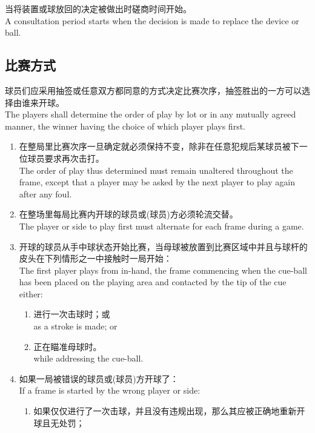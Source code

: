 \begin{enumerate}[label=(\alph*)]
\begin{enumerate}[label=(\roman*)]
        当将装置或球放回的决定被做出时磋商时间开始。\\
        A consultation period starts when the decision is made to replace the device or ball.
    \end{enumerate}
\end{enumerate}

\subsection{比赛方式}\label{2233}

\noindent 球员们应采用抽签或任意双方都同意的方式决定比赛次序，抽签胜出的一方可以选择由谁来开球。\\
The players shall determine the order of play by lot or in any mutually agreed manner, the winner having the choice of which player plays first.
\begin{enumerate}[label=(\alph*)]
    \item 在整局里比赛次序一旦确定就必须保持不变，除非在任意犯规后某球员被下一位球员要求再次击打。\\
    The order of play thus determined must remain unaltered throughout the frame, except that a player may be asked by the next player to play again after any foul.
    \item 在整场里每局比赛内开球的球员或(球员)方必须轮流交替。\\
    The player or side to play first must alternate for each frame during a game.
    \item \label{2233c}开球的球员从手中球状态开始比赛，当母球被放置到比赛区域中并且与球杆的皮头在下列情形之一中接触时一局开始：\\
    The first player plays from in-hand, the frame commencing when the cue-ball has been placed on the playing area and contacted by the tip of the cue either:
    \begin{enumerate}[label=(\roman*)]
        \item 进行一次击球时；或\\
        as a stroke is made; or
        \item 正在瞄准母球时。\\
        while addressing the cue-ball.
    \end{enumerate}
    \item \label{2233d}如果一局被错误的球员或(球员)方开球了：\\
    If a frame is started by the wrong player or side:
    \begin{enumerate}[label=(\roman*)]
        \item 如果仅仅进行了一次击球，并且没有违规出现，那么其应被正确地重新开球且无处罚；\\

\end{enumerate}
\end{enumerate}
